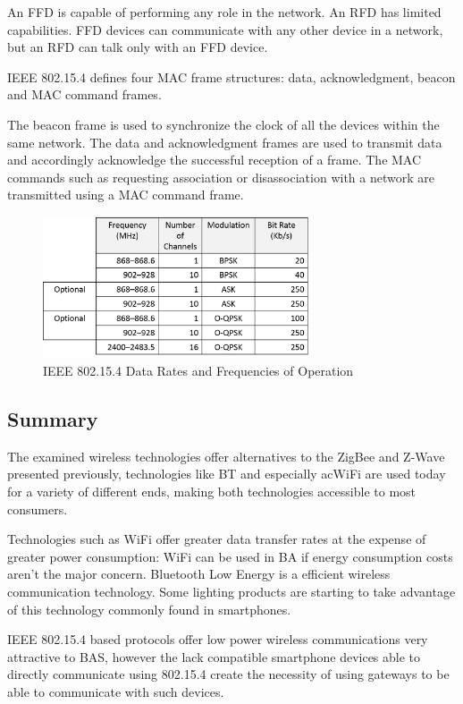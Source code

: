 An FFD is capable of performing any role in the network. An RFD has limited capabilities. FFD devices can communicate with any other device in a network, but an RFD can talk only with an FFD device. 


\ac{IEEE} 802.15.4 defines four \ac{MAC} frame structures: data, acknowledgment, beacon and MAC command frames.

The beacon frame is used to synchronize the clock of all the devices within the same network. The data and acknowledgment frames are used to transmit data and accordingly acknowledge the successful reception of a frame. The MAC commands such as requesting association or disassociation with a network are transmitted using a MAC command frame.



\begin{figure}[h]
\centering
\includegraphics[width=0.7\textwidth]{Figures/802_15_4}
\caption{IEEE 802.15.4 Data Rates and Frequencies of Operation}
\label{fig:802.15.4}
\end{figure}


\subsection{Summary}

The examined wireless technologies offer alternatives to the ZigBee and Z-Wave presented previously, technologies like \ac{BT} and especially ac{WiFi} are used today for a variety of different ends, making both technologies accessible to most consumers.

Technologies such as \ac{WiFi} offer greater data transfer rates at the expense of greater power consumption: \ac{WiFi} can be used in BA if energy consumption costs aren't the major concern. Bluetooth Low Energy is a efficient wireless communication technology. Some lighting products are starting to take advantage of this technology commonly found in smartphones.

\ac{IEEE} 802.15.4 based protocols offer low power wireless communications very attractive to BAS, however the lack compatible smartphone devices able to directly communicate using 802.15.4 create the necessity of using gateways to be able to communicate with such devices.  





